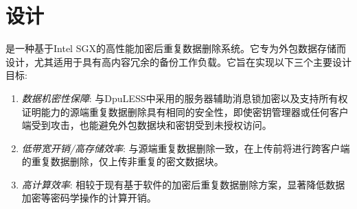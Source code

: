 \section{\sysnameS 设计}
\label{sec:sgxdedup-design}


\sysnameS 是一种基于Intel SGX的高性能加密后重复数据删除系统。它专为外包数据存储而设计，尤其适用于具有高内容冗余的备份工作负载。它旨在实现以下三个主要设计目标:
\begin{enumerate}
    \item \textit{数据机密性保障}: 与DpuLESS\cite{bellare13b}中采用的服务器辅助消息锁加密以及支持所有权证明\cite{halevi11}能力的源端重复数据删除具有相同的安全性，即使密钥管理器或任何客户端受到攻击，\sysnameS 也能避免外包数据块和密钥受到未授权访问。
    \item \textit{低带宽开销/高存储效率}: 与源端重复数据删除一致，\sysnameS 在上传前将进行跨客户端的重复数据删除，仅上传非重复的密文数据块。
    \item \textit{高计算效率}: 相较于现有基于软件的加密后重复数据删除方案，\sysnameS 显著降低数据加密等密码学操作的计算开销。
\end{enumerate}

